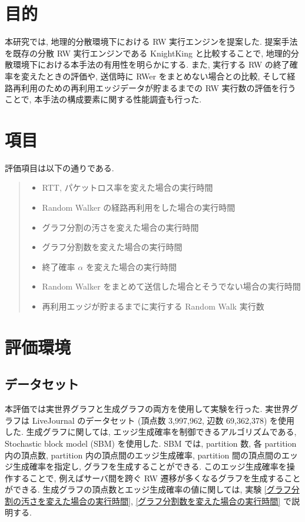 \section{目的}
本研究では, 地理的分散環境下における RW 実行エンジンを提案した. 提案手法を既存の分散 RW 実行エンジンである KnightKing \cite{10.1145/3341301.3359634} と比較することで, 地理的分散環境下における本手法の有用性を明らかにする. また, 実行する RW の終了確率を変えたときの評価や, 送信時に RWer をまとめない場合との比較, そして経路再利用のための再利用エッジデータが貯まるまでの RW 実行数の評価を行うことで, 本手法の構成要素に関する性能調査も行った. 

\section{項目}

評価項目は以下の通りである. 
\begin{quote}
    \begin{itemize}
     \item RTT, パケットロス率を変えた場合の実行時間
     \item Random Walker の経路再利用をした場合の実行時間
     \item グラフ分割の汚さを変えた場合の実行時間
     \item グラフ分割数を変えた場合の実行時間
     \item 終了確率 $\alpha$ を変えた場合の実行時間
     \item Random Walker をまとめて送信した場合とそうでない場合の実行時間
     \item 再利用エッジが貯まるまでに実行する Random Walk 実行数
    \end{itemize}
\end{quote}

\section{評価環境}

\subsection{データセット}

本評価では実世界グラフと生成グラフの両方を使用して実験を行った. 実世界グラフは LiveJournal のデータセット\cite{snapnets} (頂点数 3,997,962, 辺数 69,362,378) を使用した. 生成グラフに関しては, エッジ生成確率を制御できるアルゴリズムである, Stochastic block model (SBM) \cite{SBM} を使用した. SBM では, partition 数, 各 partition 内の頂点数, partition 内の頂点間のエッジ生成確率, partition 間の頂点間のエッジ生成確率を指定し, グラフを生成することができる. このエッジ生成確率を操作することで, 例えばサーバ間を跨ぐ RW 遷移が多くなるグラフを生成することができる. 生成グラフの頂点数とエッジ生成確率の値に関しては, 実験 \ref{グラフ分割の汚さを変えた場合の実行時間}, \ref{グラフ分割数を変えた場合の実行時間} で説明する. 

